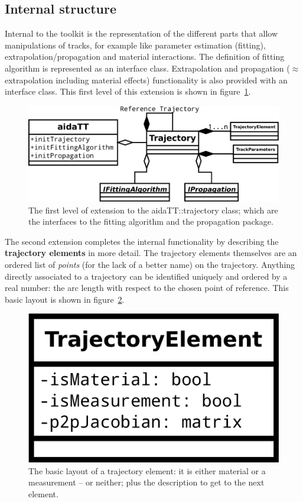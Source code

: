 \documentclass[12pt]{article}
\begin{document}
\subsection{Internal structure}
Internal to the toolkit is the representation of the different parts that allow manipulations of tracks, for example like parameter estimation (fitting), extrapolation/propagation and material interactions.
The definition of fitting algorithm is represented as an interface class.
Extrapolation and propagation ($\approx$ extrapolation including material effects) functionality is also provided with an interface class.
This first level of this extension is shown in figure~\ref{fig:bs}.
 \begin{figure}[h!]
 \begin{center}
 \includegraphics[width=.66\linewidth]{basic_structure.pdf}
 \end{center}
 \caption{The first level of extension to the aidaTT::trajectory class; which are the interfaces to the fitting algorithm and the propagation package.}
 \label{fig:bs}
 \end{figure}
 
The second extension completes the internal functionality by describing the {\bf trajectory elements} in more detail.
The trajectory elements themselves are an ordered list of {\em points} (for the lack of a better name) on the trajectory.
Anything directly associated to a trajectory can be identified uniquely and ordered by a real number: the arc length with respect to the chosen point of reference.
This basic layout is shown in figure~\ref{fig:teb}.
 \begin{figure}[h!]
 \begin{center}
 \includegraphics[width=.22\linewidth]{trajectory_element_simple.pdf}
 \end{center}
 \caption{The basic layout of a trajectory element: it is either material or a measurement -- or neither; plus the description to get to the next element.}
 \label{fig:teb}
 \end{figure}
\end{document}

